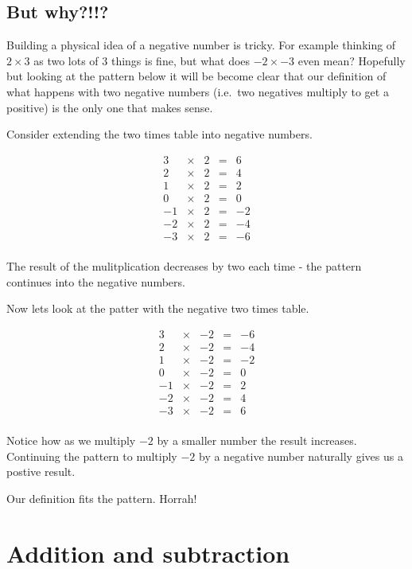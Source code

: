 \documentclass[
  a4paper,
]{scrbook}
\begin{document}
\subsection{But why?!!?}\label{but-why}

Building a physical idea of a negative number is tricky. For example
thinking of \(2 \times 3\) as two lots of 3 things is fine, but what
does \(-2 \times -3\) even mean? Hopefully but looking at the pattern
below it will be become clear that our definition of what happens with
two negative numbers (i.e.~two negatives multiply to get a positive) is
the only one that makes sense.

Consider extending the two times table into negative numbers.

\[
\begin{array}{ccccc}
3 &\times& 2& =& 6\\
2 &\times& 2& =& 4\\
1 &\times& 2& =& 2\\
0 &\times& 2& =& 0\\ 
-1 &\times& 2& =& -2\\
-2 &\times& 2& =& -4\\
-3 &\times& 2& =& -6\\ 
\end{array}
\]

The result of the mulitplication decreases by two each time - the
pattern continues into the negative numbers.

Now lets look at the patter with the negative two times table.

\[
\begin{array}{ccccc}
3 &\times& -2& =& -6\\
2 &\times& -2& =& -4\\
1 &\times& -2& =& -2\\
0 &\times& -2& =& 0\\ 
-1 &\times& -2& =& 2\\
-2 &\times& -2& =& 4\\
-3 &\times& -2& =& 6\\ 
\end{array}
\]

Notice how as we multiply \(-2\) by a smaller number the result
increases. Continuing the pattern to multiply \(-2\) by a negative
number naturally gives us a postive result.

Our definition fits the pattern. Horrah!

\section{Addition and subtraction}\label{addition-and-subtraction}
\end{document}
